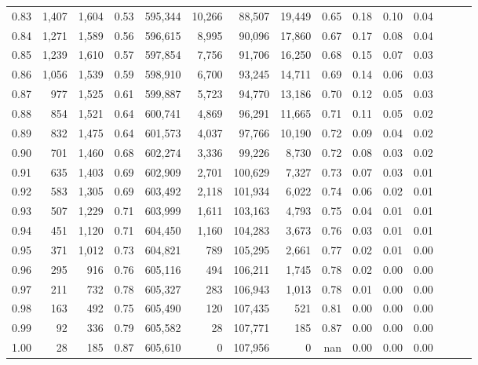 \begin{tabular}{rrrrrrrrrrrrrrr}
0.83 &   1,407 &  1,604 &  0.53 &  595,344 &   10,266 &   88,507 &   19,449 &  0.65 &  0.18 &  0.10 &      0.04 \\
0.84 &   1,271 &  1,589 &  0.56 &  596,615 &    8,995 &   90,096 &   17,860 &  0.67 &  0.17 &  0.08 &      0.04 \\
0.85 &   1,239 &  1,610 &  0.57 &  597,854 &    7,756 &   91,706 &   16,250 &  0.68 &  0.15 &  0.07 &      0.03 \\
0.86 &   1,056 &  1,539 &  0.59 &  598,910 &    6,700 &   93,245 &   14,711 &  0.69 &  0.14 &  0.06 &      0.03 \\
0.87 &     977 &  1,525 &  0.61 &  599,887 &    5,723 &   94,770 &   13,186 &  0.70 &  0.12 &  0.05 &      0.03 \\
0.88 &     854 &  1,521 &  0.64 &  600,741 &    4,869 &   96,291 &   11,665 &  0.71 &  0.11 &  0.05 &      0.02 \\
0.89 &     832 &  1,475 &  0.64 &  601,573 &    4,037 &   97,766 &   10,190 &  0.72 &  0.09 &  0.04 &      0.02 \\
0.90 &     701 &  1,460 &  0.68 &  602,274 &    3,336 &   99,226 &    8,730 &  0.72 &  0.08 &  0.03 &      0.02 \\
0.91 &     635 &  1,403 &  0.69 &  602,909 &    2,701 &  100,629 &    7,327 &  0.73 &  0.07 &  0.03 &      0.01 \\
0.92 &     583 &  1,305 &  0.69 &  603,492 &    2,118 &  101,934 &    6,022 &  0.74 &  0.06 &  0.02 &      0.01 \\
0.93 &     507 &  1,229 &  0.71 &  603,999 &    1,611 &  103,163 &    4,793 &  0.75 &  0.04 &  0.01 &      0.01 \\
0.94 &     451 &  1,120 &  0.71 &  604,450 &    1,160 &  104,283 &    3,673 &  0.76 &  0.03 &  0.01 &      0.01 \\
0.95 &     371 &  1,012 &  0.73 &  604,821 &      789 &  105,295 &    2,661 &  0.77 &  0.02 &  0.01 &      0.00 \\
0.96 &     295 &    916 &  0.76 &  605,116 &      494 &  106,211 &    1,745 &  0.78 &  0.02 &  0.00 &      0.00 \\
0.97 &     211 &    732 &  0.78 &  605,327 &      283 &  106,943 &    1,013 &  0.78 &  0.01 &  0.00 &      0.00 \\
0.98 &     163 &    492 &  0.75 &  605,490 &      120 &  107,435 &      521 &  0.81 &  0.00 &  0.00 &      0.00 \\
0.99 &      92 &    336 &  0.79 &  605,582 &       28 &  107,771 &      185 &  0.87 &  0.00 &  0.00 &      0.00 \\
1.00 &      28 &    185 &  0.87 &  605,610 &        0 &  107,956 &        0 &   nan &  0.00 &  0.00 &      0.00 \\
\bottomrule
\end{tabular}
